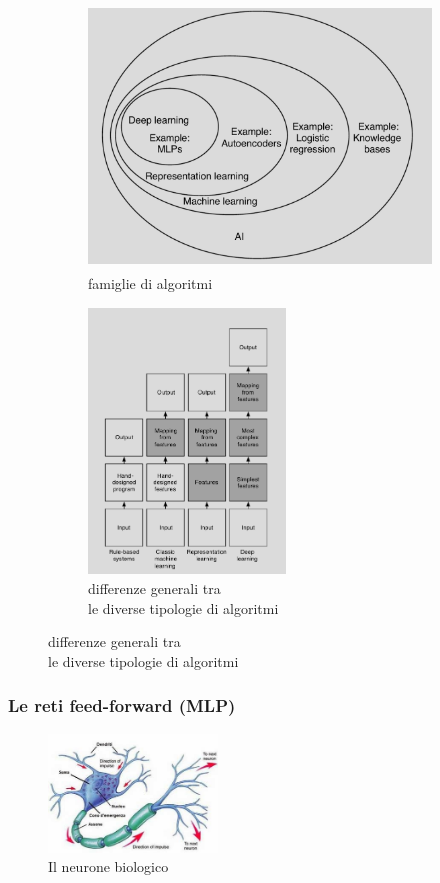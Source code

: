 \documentclass[10pt,a4paper]{article}
\begin{document}
\begin{figure}[h!]
  \centering
  \begin{subfigure}[t]{0.45\linewidth}
  	\centering
    \includegraphics[height=200pt]{AI_venn_diagram.png}
    \caption{famiglie di algoritmi}
  \end{subfigure}
  \begin{subfigure}[t]{0.45\linewidth}
  	\centering
    \includegraphics[height=200pt]{diff_between_aprochs.png}
    \caption{differenze generali tra \\ le diverse tipologie di algoritmi}
  \end{subfigure}
  \label{fig:graph1}
\end{figure}

\subsubsection{Le reti feed-forward (MLP)}

\begin{figure}
	\centering
	\vspace{-25pt}
    \includegraphics[width=0.4\textwidth]{neurone.jpg}
  	\vspace{-10pt}
  	\caption{Il neurone biologico}
  	\label{fig:graph2}
  	\vspace{-20pt}
\end{figure}
\end{document}
